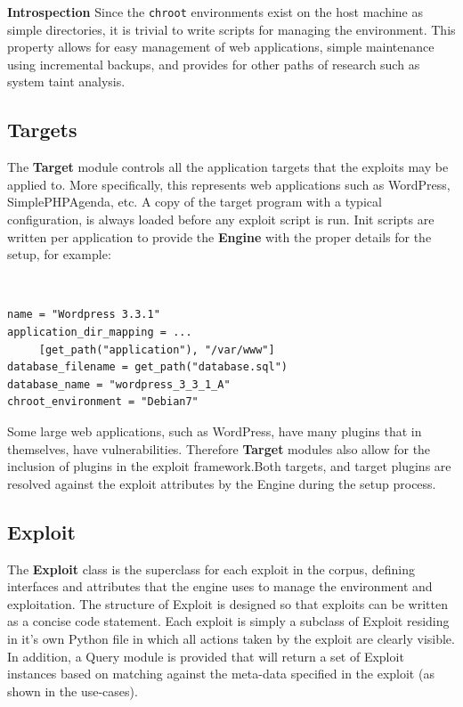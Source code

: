 \documentclass[letterpaper,twocolumn,10pt]{article}
\begin{document}
{\bf Introspection} Since the {\tt chroot} environments exist on the host machine as simple directories, it is trivial to write scripts for managing the environment. This property allows for easy management of web applications, simple maintenance using incremental backups, and provides for other paths of research such as system taint analysis.



\subsection{Targets}
   The {\bf Target} module controls all the application targets that the exploits may be applied to.  More specifically, this represents web applications such as WordPress, SimplePHPAgenda, etc. A copy of the target program with a typical configuration, is always loaded before any exploit script is run.  Init scripts are written per application to provide the {\bf Engine} with the proper details for the setup, for example:

\begin{minipage}{\textwidth}
{\tt \footnotesize
\begin{lstlisting}
name = "Wordpress 3.3.1"
application_dir_mapping = ...
     [get_path("application"), "/var/www"]
database_filename = get_path("database.sql")
database_name = "wordpress_3_3_1_A"
chroot_environment = "Debian7"
\end{lstlisting}
} 
\end{minipage}


Some large web applications, such as WordPress, have many plugins that in themselves, have vulnerabilities. Therefore {\bf Target} modules also allow for the inclusion of plugins in the exploit framework.Both targets, and target plugins are resolved against the exploit attributes by the Engine during the setup process. 


\subsection{Exploit}
The {\bf Exploit} class is the superclass for each exploit in the corpus, defining interfaces and attributes that the engine uses to manage the environment and exploitation. The structure of Exploit is designed so that exploits can be written as a concise code statement. Each exploit is simply a subclass of Exploit residing in it's own Python file in which all actions taken by the exploit are clearly visible. In addition, a Query module is provided that will return a set of Exploit instances based on matching against the meta-data specified in the exploit (as shown in the use-cases).\par
\end{document}
